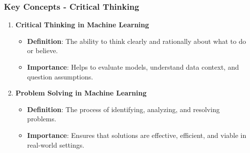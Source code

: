 \documentclass[aspectratio=169]{beamer}
\begin{document}
\begin{frame}[fragile]
    \frametitle{Key Concepts - Critical Thinking}
    \begin{enumerate}
        \item \textbf{Critical Thinking in Machine Learning}
            \begin{itemize}
                \item \textbf{Definition}: The ability to think clearly and rationally about what to do or believe.
                \item \textbf{Importance}: Helps to evaluate models, understand data context, and question assumptions.
            \end{itemize}
        \item \textbf{Problem Solving in Machine Learning}
            \begin{itemize}
                \item \textbf{Definition}: The process of identifying, analyzing, and resolving problems.
                \item \textbf{Importance}: Ensures that solutions are effective, efficient, and viable in real-world settings.
            \end{itemize}
    \end{enumerate}
\end{frame}
\end{document}
